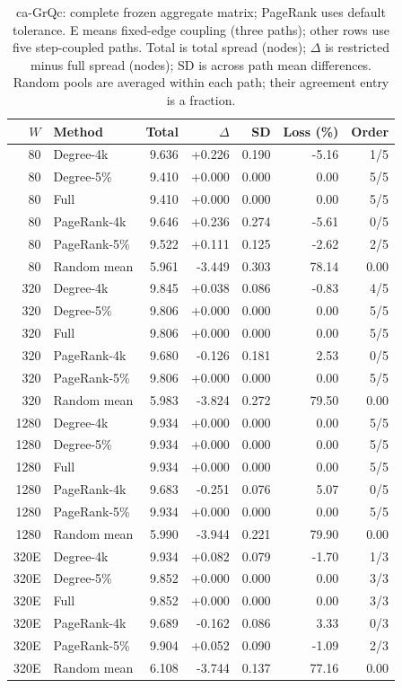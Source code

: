 \begin{table}[htbp]
\caption{ca-GrQc: complete frozen aggregate matrix; PageRank uses default tolerance. E means fixed-edge coupling (three paths); other rows use five step-coupled paths. Total is total spread (nodes); $\Delta$ is restricted minus full spread (nodes); SD is across path mean differences. Random pools are averaged within each path; their agreement entry is a fraction.}\label{tab:s-ca_grqc}
\begin{tabular}{rlrrrrr}
\toprule
$W$ & Method & Total & $\Delta$ & SD & Loss (\%) & Order \\
\midrule
80 & Degree-4k & 9.636 & +0.226 & 0.190 & -5.16 & 1/5 \\
80 & Degree-5\% & 9.410 & +0.000 & 0.000 & 0.00 & 5/5 \\
80 & Full & 9.410 & +0.000 & 0.000 & 0.00 & 5/5 \\
80 & PageRank-4k & 9.646 & +0.236 & 0.274 & -5.61 & 0/5 \\
80 & PageRank-5\% & 9.522 & +0.111 & 0.125 & -2.62 & 2/5 \\
80 & Random mean & 5.961 & -3.449 & 0.303 & 78.14 & 0.00 \\
320 & Degree-4k & 9.845 & +0.038 & 0.086 & -0.83 & 4/5 \\
320 & Degree-5\% & 9.806 & +0.000 & 0.000 & 0.00 & 5/5 \\
320 & Full & 9.806 & +0.000 & 0.000 & 0.00 & 5/5 \\
320 & PageRank-4k & 9.680 & -0.126 & 0.181 & 2.53 & 0/5 \\
320 & PageRank-5\% & 9.806 & +0.000 & 0.000 & 0.00 & 5/5 \\
320 & Random mean & 5.983 & -3.824 & 0.272 & 79.50 & 0.00 \\
1280 & Degree-4k & 9.934 & +0.000 & 0.000 & 0.00 & 5/5 \\
1280 & Degree-5\% & 9.934 & +0.000 & 0.000 & 0.00 & 5/5 \\
1280 & Full & 9.934 & +0.000 & 0.000 & 0.00 & 5/5 \\
1280 & PageRank-4k & 9.683 & -0.251 & 0.076 & 5.07 & 0/5 \\
1280 & PageRank-5\% & 9.934 & +0.000 & 0.000 & 0.00 & 5/5 \\
1280 & Random mean & 5.990 & -3.944 & 0.221 & 79.90 & 0.00 \\
320E & Degree-4k & 9.934 & +0.082 & 0.079 & -1.70 & 1/3 \\
320E & Degree-5\% & 9.852 & +0.000 & 0.000 & 0.00 & 3/3 \\
320E & Full & 9.852 & +0.000 & 0.000 & 0.00 & 3/3 \\
320E & PageRank-4k & 9.689 & -0.162 & 0.086 & 3.33 & 0/3 \\
320E & PageRank-5\% & 9.904 & +0.052 & 0.090 & -1.09 & 2/3 \\
320E & Random mean & 6.108 & -3.744 & 0.137 & 77.16 & 0.00 \\
\bottomrule
\end{tabular}
\end{table}

